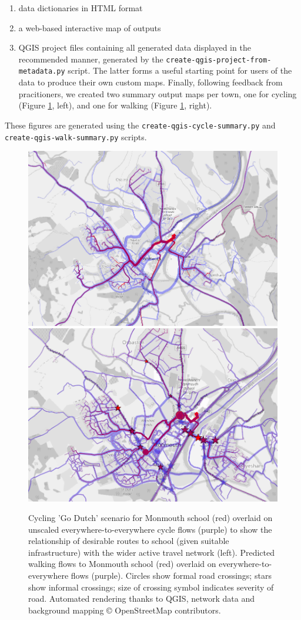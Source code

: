 \documentclass[galley]{jtlu-article-2col}
\providecommand{\tightlist}{%
  \setlength{\itemsep}{0pt}\setlength{\parskip}{0pt}}
\begin{document}
\begin{enumerate}
\def\labelenumi{\arabic{enumi}.}
\tightlist
\item
  data dictionaries in HTML format
\item
  a web-based interactive map of outputs
\item
  QGIS project files containing all generated data displayed in the recommended manner, generated by the \texttt{create-qgis-project-from-metadata.py} script.
  The latter forms a useful starting point for users of the data to produce their own custom maps.
  Finally, following feedback from pracitioners, we created two summary output maps per town, one for cycling (Figure \ref{fig:sdnaresult}, left), and one for walking (Figure \ref{fig:sdnaresult}, right).
\end{enumerate}

These figures are generated using the \texttt{create-qgis-cycle-summary.py} and \texttt{create-qgis-walk-summary.py} scripts.

\begin{figure}

{\centering \includegraphics[width=0.49\linewidth]{figures/sdnaresult} \includegraphics[width=0.49\linewidth]{figures/sdnaresult2} 

}

\caption{Cycling 'Go Dutch' scenario for Monmouth school (red) overlaid on unscaled everywhere-to-everywhere cycle flows (purple) to show the relationship of desirable routes to school (given suitable infrastructure) with the wider active travel network (left). Predicted walking flows to Monmouth school (red) overlaid on everywhere-to-everywhere flows (purple). Circles show formal road crossings; stars show informal crossings; size of crossing symbol indicates severity of road. Automated rendering thanks to QGIS, network data and background mapping © OpenStreetMap contributors.}\label{fig:sdnaresult}
\end{figure}
\end{document}
